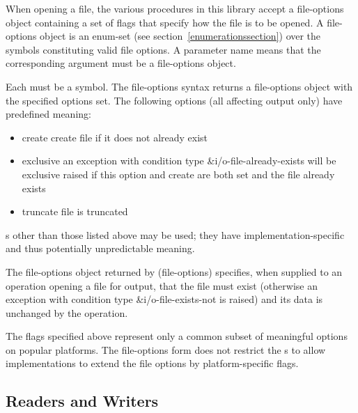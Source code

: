 When opening a file, the various procedures in this library accept a
{\cf file-options} object containing a set of flags that specify how
the file is to be opened. A {\cf file-options} object is an enum-set
(see section~\ref{enumerationssection}) over the symbols constituting
valid file options.
A  parameter name means that the
corresponding argument must be a file-options object.

\begin{entry}{%
}

Each  must be a symbol.
The {\cf file-options} syntax returns a file-options object with the
specified options set. The following options (all affecting output
only) have predefined meaning:

\begin{itemize}   
\item {\cf create} create file if it does not already exist
\item {\cf exclusive} an exception with condition type
  {\cf\&i/o-file-already-exists} will be exclusive raised if this
  option and {\cf create} are both set and the file already exists
\item {\cf truncate}
  file is truncated
\end{itemize}

s other than those listed above may be used;
they have implementation-specific and thus potentially unpredictable
meaning.

The file-options object returned by {\cf (file-options)} specifies,
when supplied to an operation opening a file for output, that the file
must exist (otherwise an exception with condition type
{\cf\&i/o-file-exists-not} is raised) and its data is unchanged by the
operation.

\begin{rationale}
  The flags specified above represent only a common subset of
  meaningful options on popular platforms.  The {\cf file-options}
  form does not restrict the s to allow
  implementations to extend the file options by platform-specific
  flags.
\end{rationale}
\end{entry}   

\subsection{Readers and Writers}


